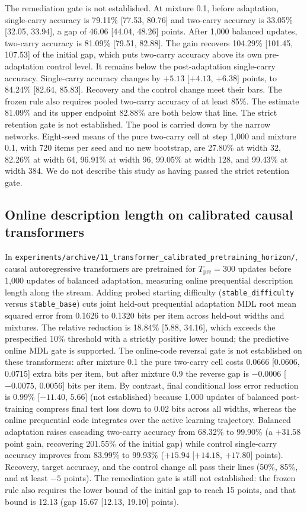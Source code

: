 The remediation gate is not established.
At mixture 0.1, before adaptation, single-carry accuracy is 79.11\% [77.53, 80.76] and two-carry accuracy is 33.05\% [32.05, 33.94], a gap of 46.06 [44.04, 48.26] points.
After 1{,}000 balanced updates, two-carry accuracy is 81.09\% [79.51, 82.88].
The gain recovers 104.29\% [101.45, 107.53] of the initial gap, which puts two-carry accuracy above its own pre-adaptation control level.
It remains below the post-adaptation single-carry accuracy.
Single-carry accuracy changes by $+5.13$ [$+4.13$, $+6.38$] points, to 84.24\% [82.64, 85.83].
Recovery and the control change meet their bars.
The frozen rule also requires pooled two-carry accuracy of at least 85\%.
The estimate 81.09\% and its upper endpoint 82.88\% are both below that line.
The strict retention gate is not established.
The pool is carried down by the narrow networks.
Eight-seed means of the pure two-carry cell at step 1{,}000 and mixture 0.1, with 720 items per seed and no new bootstrap, are 27.80\% at width 32, 82.26\% at width 64, 96.91\% at width 96, 99.05\% at width 128, and 99.43\% at width 384.
We do not describe this study as having passed the strict retention gate.

\subsection{Online description length on calibrated causal transformers}
\label{sec:exp11_mdl}
In \texttt{experiments/archive/11\_transformer\_calibrated\_pretraining\_horizon/}, causal autoregressive transformers are pretrained for $T_{\text{pre}}=300$ updates before 1{,}000 updates of balanced adaptation, measuring online prequential description length along the stream.
Adding probed starting difficulty (\texttt{stable\_difficulty} versus \texttt{stable\_base}) cuts joint held-out prequential adaptation MDL root mean squared error from 0.1626 to 0.1320 bits per item across held-out widths and mixtures.
The relative reduction is 18.84\% [5.88, 34.16], which exceeds the prespecified 10\% threshold with a strictly positive lower bound; the predictive online MDL gate is supported.
The online-code reversal gate is not established on these transformers: after mixture 0.1 the pure two-carry cell costs 0.0666 [0.0606, 0.0715] extra bits per item, but after mixture 0.9 the reverse gap is $-0.0006$ [$-0.0075$, $0.0056$] bits per item.
By contrast, final conditional loss error reduction is 0.99\% [$-11.40$, $5.66$] (not established) because 1{,}000 updates of balanced post-training compress final test loss down to 0.02 bits across all widths, whereas the online prequential code integrates over the active learning trajectory.
Balanced adaptation raises cascading two-carry accuracy from 68.32\% to 99.90\% (a $+31.58$ point gain, recovering 201.55\% of the initial gap) while control single-carry accuracy improves from 83.99\% to 99.93\% ($+15.94$ [$+14.18$, $+17.80$] points).
Recovery, target accuracy, and the control change all pass their lines (50\%, 85\%, and at least $-5$ points).
The remediation gate is still not established: the frozen rule also requires the lower bound of the initial gap to reach 15 points, and that bound is 12.13 (gap 15.67 [12.13, 19.10] points).
